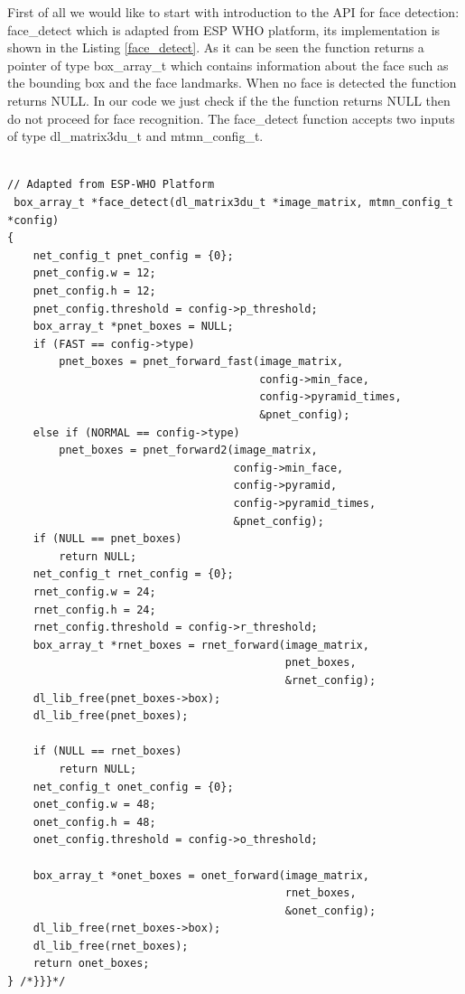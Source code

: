 First of all we would like to start with introduction to the API for face detection: {\selectfont face\_detect} which is adapted from ESP WHO platform, its implementation is shown in the Listing \ref{face_detect}. As it can be seen the function returns a pointer of type {\selectfont box\_array\_t} which contains information about the face such as the bounding box and the face landmarks. When no face is detected the function returns {\selectfont NULL}. In our code we just check if the the function returns {\selectfont NULL} then do not proceed for face recognition. The {\selectfont face\_detect} function accepts two inputs of type {\selectfont dl\_matrix3du\_t} and {\selectfont mtmn\_config\_t}. 


\begin{lstlisting}[caption={Face detection API},label=face_detect, captionpos=b]

// Adapted from ESP-WHO Platform
 box_array_t *face_detect(dl_matrix3du_t *image_matrix, mtmn_config_t *config)
{ 
    net_config_t pnet_config = {0};
    pnet_config.w = 12;
    pnet_config.h = 12;
    pnet_config.threshold = config->p_threshold;
    box_array_t *pnet_boxes = NULL;
    if (FAST == config->type)
        pnet_boxes = pnet_forward_fast(image_matrix,
                                       config->min_face,
                                       config->pyramid_times,
                                       &pnet_config);
    else if (NORMAL == config->type)
        pnet_boxes = pnet_forward2(image_matrix,
                                   config->min_face,
                                   config->pyramid,
                                   config->pyramid_times,
                                   &pnet_config);
    if (NULL == pnet_boxes)
        return NULL;
    net_config_t rnet_config = {0};
    rnet_config.w = 24;
    rnet_config.h = 24;
    rnet_config.threshold = config->r_threshold;
    box_array_t *rnet_boxes = rnet_forward(image_matrix,
                                           pnet_boxes,
                                           &rnet_config);
    dl_lib_free(pnet_boxes->box);
    dl_lib_free(pnet_boxes);

    if (NULL == rnet_boxes)
        return NULL;
    net_config_t onet_config = {0};
    onet_config.w = 48;
    onet_config.h = 48;
    onet_config.threshold = config->o_threshold;

    box_array_t *onet_boxes = onet_forward(image_matrix,
                                           rnet_boxes,
                                           &onet_config);
    dl_lib_free(rnet_boxes->box);
    dl_lib_free(rnet_boxes);
    return onet_boxes;
} /*}}}*/
\end{lstlisting}






